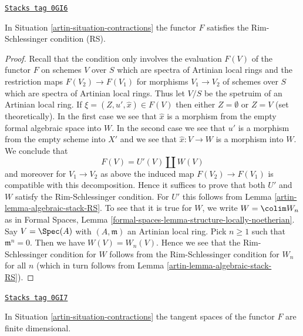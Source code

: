 \begin{lemma}[Rs]
\label{artin-lemma-rs}
\href{https://stacks.math.columbia.edu/tag/0GI6}{\texttt{Stacks tag 0GI6}}

In Situation \ref{artin-situation-contractions} the functor $F$ satisfies
the Rim-Schlessinger condition (RS).
\end{lemma}

\begin{proof}

Recall that the condition only involves the evaluation $F(V)$ of the functor
$F$ on schemes $V$ over $S$ which are spectra of Artinian local rings
and the restriction maps $F(V_2) \to F(V_1)$ for morphisms $V_1 \to V_2$
of schemes over $S$ which are spectra of Artinian local rings.
Thus let $V/S$ be the spetruim of an Artinian local ring.
If $\xi = (Z, u', \hat x) \in F(V)$ then either $Z = \emptyset$
or $Z = V$ (set theoretically). In the first case we see that
$\hat x$ is a morphism from the empty formal algebraic space
into $W$. In the second case we see that $u'$ is a morphism from
the empty scheme into $X'$ and we see that $\hat x : V \to W$
is a morphism into $W$. We conclude that
$$
F(V) = U'(V) \amalg W(V)
$$
and moreover for $V_1 \to V_2$ as above the induced map
$F(V_2) \to F(V_1)$ is compatible with this decomposition.
Hence it suffices to prove that both $U'$ and $W$ satisfy the
Rim-Schlessinger condition. For $U'$ this follows from
Lemma \ref{artin-lemma-algebraic-stack-RS}.
To see that it is true for $W$, we write $W = \colim W_n$ as in
Formal Spaces, Lemma
\ref{formal-spaces-lemma-structure-locally-noetherian}.
Say $V = \Spec(A)$ with $(A, \mathfrak m)$ an Artinian local ring.
Pick $n \geq 1$ such that $\mathfrak m^n = 0$. Then we have
$W(V) = W_n(V)$. Hence we see that the Rim-Schlessinger condition
for $W$ follows from the Rim-Schlessinger condition for $W_n$ for
all $n$ (which in turn follows from
Lemma \ref{artin-lemma-algebraic-stack-RS}).
\end{proof}

\begin{lemma}
\label{artin-lemma-finite-dim}
\href{https://stacks.math.columbia.edu/tag/0GI7}{\texttt{Stacks tag 0GI7}}

In Situation \ref{artin-situation-contractions} the tangent spaces of
the functor $F$ are finite dimensional.
\end{lemma}

